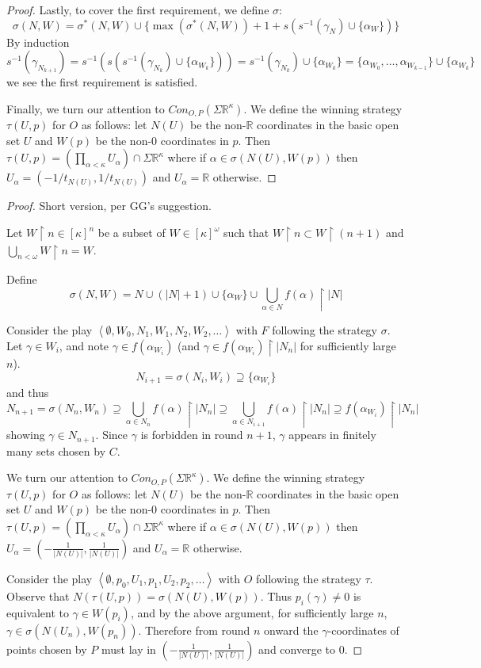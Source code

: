 \documentclass[11pt]{article}
\theoremstyle{plain}
\theoremstyle{definition}
\theoremstyle{remark}
\begin{document}
\begin{proof}
Lastly, to cover the first requirement, we define $\sigma$: \[\sigma(N,W) = \sigma^*(N,W) \cup \{ \max(\sigma^*(N,W))+1+s(s^{-1}(\gamma_N)\cup\{\alpha_W\}) \}\] By induction \[s^{-1}(\gamma_{N_{k+1}}) = s^{-1}(s(s^{-1}(\gamma_{N_k})\cup\{\alpha_{W_k}\})) = s^{-1}(\gamma_{N_k})\cup\{\alpha_{W_k}\} = \{\alpha_{W_0},\dots,\alpha_{W_{k-1}}\}\cup\{\alpha_{W_k}\}\] we see the first requirement is satisfied.

Finally, we turn our attention to $Con_{O,P}(\Sigma\mathbb{R}^\kappa)$. We define the winning strategy $\tau(U,p)$ for $O$ as follows: let $N(U)$ be the non-$\mathbb{R}$ coordinates in the basic open set $U$ and $W(p)$ be the non-$0$ coordinates in $p$. Then $\tau(U,p) = \left(\prod_{\alpha<\kappa} U_\alpha\right) \cap \Sigma\mathbb{R}^\kappa$ where if $\alpha \in \sigma(N(U),W(p))$ then $U_\alpha = (-1/t_{N(U)},1/t_{N(U)})$ and $U_\alpha=\mathbb{R}$ otherwise.
\end{proof}

\begin{proof}
Short version, per GG's suggestion.

Let $W\restriction n \in [\kappa]^n$ be a subset of $W\in[\kappa]^\omega$ such that $W\restriction n \subset W \restriction (n+1)$ and $\bigcup_{n<\omega} W\restriction n = W$.

Define \[\sigma(N,W) = N \cup (|N|+1) \cup \{\alpha_W\} \cup \bigcup_{\alpha \in N} f(\alpha) \restriction |N|\]

Consider the play $\left<\emptyset,W_0,N_1,W_1,N_2,W_2,\dots\right>$ with $F$ following the strategy $\sigma$. Let $\gamma \in W_i$, and note $\gamma \in f(\alpha_{W_i})$ (and $\gamma \in f(\alpha_{W_i})\restriction |N_n|$ for sufficiently large $n$). \[N_{i+1} = \sigma(N_i,W_i) \supseteq \{\alpha_{W_i}\}\] and thus \[N_{n+1} = \sigma(N_n,W_n) \supseteq \bigcup_{\alpha \in N_n} f(\alpha) \restriction |N_n| \supseteq \bigcup_{\alpha \in N_{i+1}} f(\alpha) \restriction |N_n| \supseteq f(\alpha_{W_i}) \restriction |N_n|\] showing $\gamma \in N_{n+1}$. Since $\gamma$ is forbidden in round $n+1$, $\gamma$ appears in finitely many sets chosen by $C$.

We turn our attention to $Con_{O,P}(\Sigma\mathbb{R}^\kappa)$. We define the winning strategy $\tau(U,p)$ for $O$ as follows: let $N(U)$ be the non-$\mathbb{R}$ coordinates in the basic open set $U$ and $W(p)$ be the non-$0$ coordinates in $p$. Then $\tau(U,p) = \left(\prod_{\alpha<\kappa} U_\alpha\right) \cap \Sigma\mathbb{R}^\kappa$ where if $\alpha \in \sigma(N(U),W(p))$ then $U_\alpha = (-\frac{1}{|N(U)|},\frac{1}{|N(U)|})$ and $U_\alpha=\mathbb{R}$ otherwise.

Consider the play $\left<\emptyset,p_0,U_1,p_1,U_2,p_2,\dots\right>$ with $O$ following the strategy $\tau$. Observe that $N(\tau(U,p))=\sigma(N(U),W(p))$. Thus $p_i(\gamma)\not=0$ is equivalent to $\gamma \in W(p_i)$, and by the above argument, for sufficiently large $n$, $\gamma \in \sigma(N(U_n),W(p_n))$. Therefore from round $n$ onward the $\gamma$-coordinates of points chosen by $P$ must lay in $(-\frac{1}{|N(U)|},\frac{1}{|N(U)|})$ and converge to $0$.
\end{proof}
\end{document}
